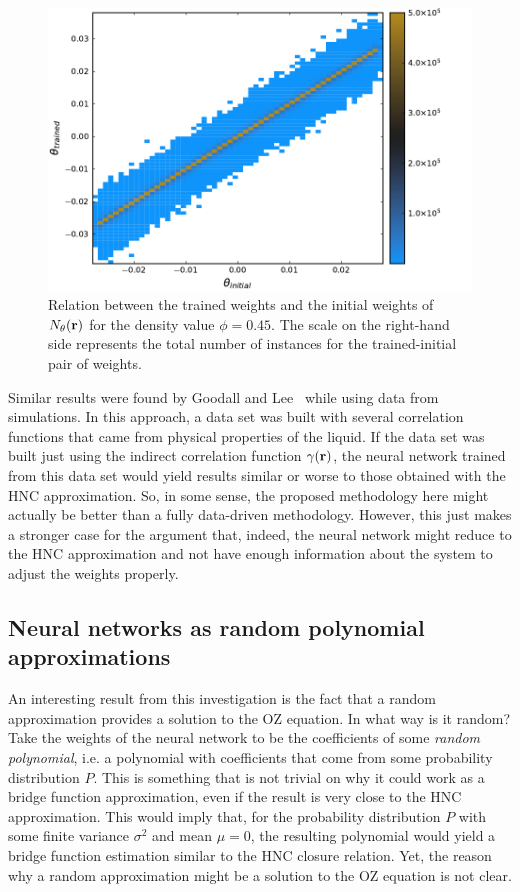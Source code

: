 \begin{figure}[t]
    \includegraphics[width=\textwidth]{figuras/capitulo-3/weights_phi=0.45.pdf}
    \caption[Comparison between weights, $\phi=0.45$.]{Relation between the trained weights and the initial weights of $N_{\theta}(\mathbf{r})$ for the density value $\phi=0.45$. The scale on the right-hand side represents the total number of instances for the trained-initial pair of weights.}
    \label{fig:pesos45}
\end{figure}

Similar results were found by Goodall and Lee~\cite{a.goodallDatadrivenApproximationsBridge2021}
while using data from simulations. In this approach, a data set was built with several
correlation functions that came from physical properties of the liquid. If the data set was built
just using the indirect correlation function $\gamma(\mathbf{r})$, the neural network trained from this data
set would yield results similar or worse to those obtained with the HNC approximation.
So, in some sense, the proposed methodology here might actually be better than a fully
data-driven methodology. However, this just makes a stronger case for the argument that,
indeed, the neural network might reduce to the HNC approximation and not have enough
information about the system to adjust the weights properly.

\subsection{Neural networks as random polynomial approximations}
An interesting result from this investigation is the fact that a random approximation
provides a solution to the OZ equation. In what way is it random? Take the weights of the
neural network to be the coefficients of some \emph{random polynomial}, i.e. a polynomial 
with coefficients that come from some probability distribution $P$. This is something that 
is not trivial on why it could work as a bridge function approximation, even if the result
is very close to the HNC approximation. This would imply that, for the probability 
distribution $P$ with some finite variance $\sigma^2$ and mean $\mu=0$, the resulting
polynomial would yield a bridge function estimation similar to the HNC closure relation.
Yet, the reason why a random approximation might be a solution to the OZ equation is not
clear.

